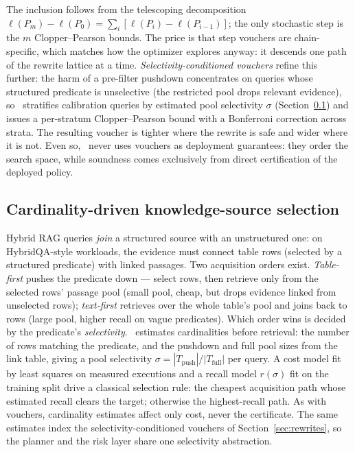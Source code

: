 The inclusion follows from the telescoping decomposition
$\ell(P_m) - \ell(P_0) = \sum_i [\ell(P_i) - \ell(P_{i-1})]$; the only
stochastic step is the $m$ Clopper--Pearson bounds. The price is that
step vouchers are
chain-specific, which matches how the optimizer explores anyway: it
descends one path of the rewrite lattice at a time.
\emph{Selectivity-conditioned vouchers} refine this further: the harm
of a pre-filter pushdown concentrates on queries whose structured
predicate is unselective (the restricted pool drops relevant
evidence), so \system\ stratifies calibration queries by estimated
pool selectivity $\sigma$ (Section~\ref{sec:planner}) and issues a
per-stratum Clopper--Pearson bound with a Bonferroni correction across
strata. The resulting voucher is tighter where the rewrite is safe and
wider where it is not. Even so, \system\ never uses vouchers
as deployment guarantees: they order the search space, while soundness
comes exclusively from direct certification of the deployed policy.

\subsection{Cardinality-driven knowledge-source selection}
\label{sec:planner}

Hybrid RAG queries \emph{join} a structured source with an unstructured
one: on HybridQA-style workloads, the evidence must connect table rows
(selected by a structured predicate) with linked passages. Two
acquisition orders exist. \emph{Table-first} pushes the predicate down
--- select rows, then retrieve only from the selected rows' passage
pool (small pool, cheap, but drops evidence linked from unselected
rows); \emph{text-first} retrieves over the whole table's pool and
joins back to rows (large pool, higher recall on vague predicates).
Which order wins is decided by the predicate's \emph{selectivity}.
\system\ estimates cardinalities before retrieval: the number of rows
matching the predicate, and the pushdown and full pool sizes from the
link table, giving a pool selectivity
$\sigma = |T_{\mathrm{push}}| / |T_{\mathrm{full}}|$ per query. A cost
model fit by least squares on measured executions and a recall model
$r(\sigma)$ fit on the training split drive a classical selection rule:
the cheapest acquisition path whose estimated recall clears the target;
otherwise the highest-recall path. As with vouchers, cardinality
estimates affect only cost, never the certificate. The same estimates
index the selectivity-conditioned vouchers of
Section~\ref{sec:rewrites}, so the planner and the risk layer share one
selectivity abstraction.

